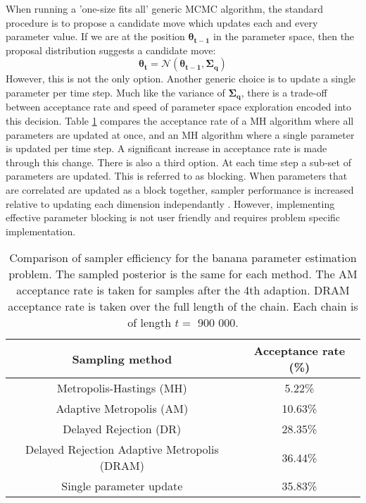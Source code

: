When running a 'one-size fits all' generic MCMC algorithm, the standard procedure is to propose a candidate move which updates each and every parameter value. If we are at the position $\bm{\theta_{t-1}}$ in the parameter space, then the proposal distribution suggests a candidate move:
\begin{equation}
	\bm{\theta_{t}} = \mathcal{N}(\bm{\theta_{t-1}},\bm{\Sigma_q})
\end{equation}
However, this is not the only option. Another generic choice is to update a single parameter per time step. Much like the variance of $\bm{\Sigma_q}$, there is a trade-off between acceptance rate and speed of parameter space exploration encoded into this decision. Table \ref{sampling-method-comparison} compares the acceptance rate of a MH algorithm where all parameters are updated at once, and an MH algorithm where a single parameter is updated per time step. A significant increase in acceptance rate is made through this change. There is also a third option. At each time step a sub-set of parameters are updated. This is referred to as blocking. When parameters that are correlated are updated as a block together, sampler performance is increased relative to updating each dimension independantly \citep{Turek2017}. However, implementing effective parameter blocking is not user friendly and requires problem specific implementation. 

\begin{table}[H]
	\centering
	\begin{tabular}{|c|c|}
	\hline
	Sampling method & Acceptance rate (\%) \\
	\hline
	Metropolis-Hastings (MH) & 5.22\% \\
	\hline
	Adaptive Metropolis (AM) & 10.63\% \\
	\hline
	Delayed Rejection (DR) & 28.35\% \\
	\hline
	Delayed Rejection Adaptive Metropolis (DRAM) & 36.44\% \\
	\hline
	Single parameter update & 35.83\% \\
	\hline
	\end{tabular}
	\caption{Comparison of sampler efficiency for the banana parameter estimation problem. The sampled posterior is the same for each method. The AM acceptance rate is taken for samples after the 4th adaption. DRAM acceptance rate is taken over the full length of the chain. Each chain is of length $t = $ 900 000.}
	\label{sampling-method-comparison}
\end{table}

